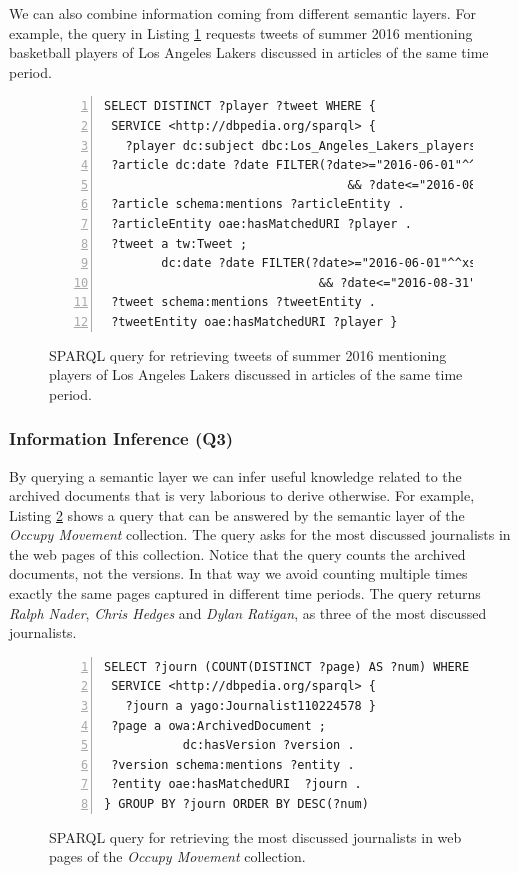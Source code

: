 \documentclass[twocolumn]{svjour3}
\begin{document}
We can also combine information coming from
different semantic layers.
For example, the query in Listing \ref{fig:queryCombine} requests
tweets of summer 2016 mentioning
basketball players of Los Angeles Lakers discussed in articles of the
same time period.

\begin{figure}[th]
\centering \scriptsize
\begin{Verbatim}[frame=lines,numbers=left,numbersep=1pt]
SELECT DISTINCT ?player ?tweet WHERE {
 SERVICE <http://dbpedia.org/sparql> {
   ?player dc:subject dbc:Los_Angeles_Lakers_players }
 ?article dc:date ?date FILTER(?date>="2016-06-01"^^xsd:date
                                  && ?date<="2016-08-31"^^xsd:date)
 ?article schema:mentions ?articleEntity .
 ?articleEntity oae:hasMatchedURI ?player .
 ?tweet a tw:Tweet ;
        dc:date ?date FILTER(?date>="2016-06-01"^^xsd:date
                              && ?date<="2016-08-31"^^xsd:date) .
 ?tweet schema:mentions ?tweetEntity .
 ?tweetEntity oae:hasMatchedURI ?player }
\end{Verbatim}
\vspace{-4mm}
\caption{SPARQL query for retrieving tweets of summer 2016
mentioning players of Los Angeles Lakers discussed in articles of the same time period.}
\label{fig:queryCombine}
\end{figure}

\subsubsection*{Information Inference (Q3)}
By querying a semantic layer we can infer
useful knowledge related to the archived documents
that is very laborious to derive otherwise.
For example,
Listing \ref{fig:queryExampleInfer} shows a query that can be answered by the semantic layer
of the {\em Occupy Movement} collection.
The query asks for the most discussed journalists in the
web pages of this collection.
Notice that the query counts the archived documents, not the versions.
In that way we avoid counting multiple times exactly the same pages
captured in different time periods.
The query returns {\em Ralph Nader},
{\em Chris Hedges} and {\em Dylan Ratigan},
as three of the most discussed journalists.

\begin{figure}[th]
\centering \scriptsize
\begin{Verbatim}[frame=lines,numbers=left,numbersep=1pt]
SELECT ?journ (COUNT(DISTINCT ?page) AS ?num) WHERE {
 SERVICE <http://dbpedia.org/sparql> {
   ?journ a yago:Journalist110224578 }
 ?page a owa:ArchivedDocument ;
           dc:hasVersion ?version .
 ?version schema:mentions ?entity .
 ?entity oae:hasMatchedURI  ?journ .
} GROUP BY ?journ ORDER BY DESC(?num)
\end{Verbatim}
\vspace{-4mm}
\caption{SPARQL query for retrieving the most discussed
journalists in web pages of the {\em Occupy Movement} collection.}
\label{fig:queryExampleInfer}
\end{figure}
\end{document}
